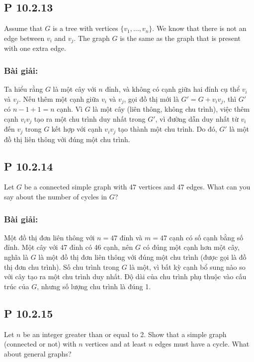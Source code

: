 \documentclass[a4paper,12pt]{article}
\begin{document}
\subsection*{P 10.2.13}
Assume that \( G \) is a tree with vertices \( \{v_1, \ldots, v_n\} \). We know that there is not an edge between \( v_i \) and \( v_j \). The graph \( G \) is the same as the graph that is present with one extra edge.

\subsubsection*{Bài giải:}
Ta hiểu rằng \( G \) là một cây với \( n \) đỉnh, và không có cạnh giữa hai đỉnh cụ thể \( v_i \) và \( v_j \). Nếu thêm một cạnh giữa \( v_i \) và \( v_j \), gọi đồ thị mới là \( G' = G + v_iv_j \), thì \( G' \) có \( n - 1 + 1 = n \) cạnh. Vì \( G \) là một cây (liên thông, không chu trình), việc thêm cạnh \( v_iv_j \) tạo ra một chu trình duy nhất trong \( G' \), vì đường dẫn duy nhất từ \( v_i \) đến \( v_j \) trong \( G \) kết hợp với cạnh \( v_iv_j \) tạo thành một chu trình. Do đó, \( G' \) là một đồ thị liên thông với đúng một chu trình.

\subsection*{P 10.2.14}
Let \( G \) be a connected simple graph with 47 vertices and 47 edges. What can you say about the number of cycles in \( G \)?

\subsubsection*{Bài giải:}
Một đồ thị đơn liên thông với \( n = 47 \) đỉnh và \( m = 47 \) cạnh có số cạnh bằng số đỉnh. Một cây với 47 đỉnh có 46 cạnh, nên \( G \) có đúng một cạnh hơn một cây, nghĩa là \( G \) là một đồ thị đơn liên thông với đúng một chu trình (được gọi là đồ thị đơn chu trình). Số chu trình trong \( G \) là một, vì bất kỳ cạnh bổ sung nào so với cây tạo ra một chu trình duy nhất. Độ dài của chu trình phụ thuộc vào cấu trúc của \( G \), nhưng số lượng chu trình là đúng 1.

\subsection*{P 10.2.15}
Let \( n \) be an integer greater than or equal to 2. Show that a simple graph (connected or not) with \( n \) vertices and at least \( n \) edges must have a cycle. What about general graphs?
\end{document}
